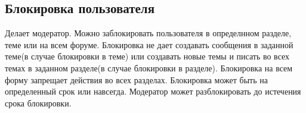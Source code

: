 \documentclass[a4paper, 12pt]{article}
\begin{document}
	\subsection{Блокировка пользователя}
		Делает модератор. Можно заблокировать пользователя в определнном разделе, теме или на всем форуме. Блокировка не дает создавать сообщения в заданной теме(в случае блокировки в теме) или создавать новые темы и писать во всех темах в заданном разделе(в случае блокировки в разделе). Блокировка на всем форму запрещает действия во всех разделах. Блокировка может быть на определенный срок или навсегда. Модератор может разблокировать до истечения срока блокировки.
		
	
\end{document}
